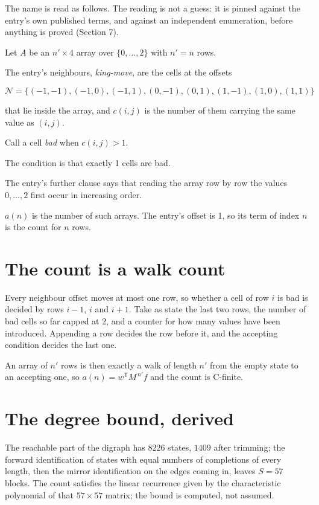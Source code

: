\documentclass[11pt]{article}
\theoremstyle{definition}
\begin{document}
The name is read as follows. The reading is not a guess: it is pinned against the entry's own published terms, and against an independent enumeration, before anything is proved (Section 7).

Let $A$ be an $n' \times 4$ array over $\{0,\dots,2\}$ with $n' = n$ rows.

The entry's neighbours, {\itshape king-move}, are the cells at the offsets

\[\mathcal{N} = \{(-1,-1), (-1,0), (-1,1), (0,-1), (0,1), (1,-1), (1,0), (1,1)\}\]

that lie inside the array, and $c(i,j)$ is the number of them carrying the same value as $(i,j)$.

Call a cell {\itshape bad} when $c(i,j) > 1$.

The condition is that exactly 1 cells are bad.

The entry's further clause says that reading the array row by row the values $0,\dots,2$ first occur in increasing order.

$a(n)$ is the number of such arrays. The entry's offset is 1, so its term of index $n$ is the count for $n$ rows.

\section{The count is a walk count}

Every neighbour offset moves at most one row, so whether a cell of row $i$ is bad is decided by rows $i-1$, $i$ and $i+1$. Take as state the last two rows, the number of bad cells so far capped at 2, and a counter for how many values have been introduced. Appending a row decides the row before it, and the accepting condition decides the last one.

An array of $n'$ rows is then exactly a walk of length $n'$ from the empty state to an accepting one, so $a(n) = w^{\mathsf T}M^{\,n'}f$ and the count is C-finite.

\section{The degree bound, derived}

The reachable part of the digraph has $8226$ states, $1409$ after trimming; the forward identification of states with equal numbers of completions of every length, then the mirror identification on the edges coming in, leaves $S = 57$ blocks. The count satisfies the linear recurrence given by the characteristic polynomial of that $57\times57$ matrix; the bound is computed, not assumed.
\end{document}
